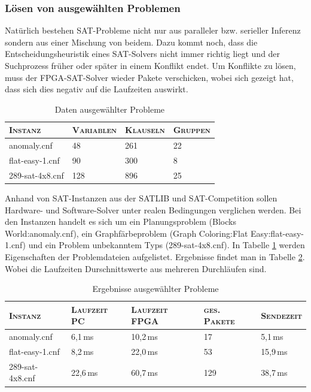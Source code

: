 \subsubsection{Lösen von ausgewählten Problemen}
Natürlich bestehen SAT-Probleme nicht nur aus paralleler
bzw. serieller Inferenz sondern aus einer Mischung von
beidem. Dazu kommt noch, dass die Entscheidungsheuristik
eines SAT-Solvers nicht immer richtig liegt und der
Suchprozess früher oder später in einem Konflikt endet.
Um Konflikte zu lösen, muss der FPGA-SAT-Solver wieder
Pakete verschicken, wobei sich gezeigt hat, dass sich dies
negativ auf die Laufzeiten auswirkt.
\begin{table}[h]
  \centering
  \begin{tabular}{|l|l|l|l|}
    \hline
    \textsc{Instanz} & \textsc{Variablen} & \textsc{Klauseln} &\textsc{Gruppen}\\
    \hline
    \hline
    anomaly.cnf & 48 & 261 & 22\\
    \hline
    flat-easy-1.cnf & 90 & 300 & 8\\
    \hline
    289-sat-4x8.cnf & 128 & 896 & 25\\
    \hline
  \end{tabular}
  \caption{Daten ausgewählter Probleme}
  \label{problems_data}
\end{table}
Anhand von SAT-Instanzen aus der SATLIB \cite{satlib:2003} und
SAT-Competition \cite{satcomp:2011}
sollen Hardware- und Software-Solver unter realen 
Bedingungen verglichen werden. Bei den Instanzen handelt es
sich um ein Planungsproblem (Blocks World:anomaly.cnf), 
ein Graphfärbeproblem (Graph Coloring:Flat Easy:flat-easy-1.cnf) 
und ein Problem unbekanntem Typs (289-sat-4x8.cnf).
In Tabelle \ref{problems_data} werden Eigenschaften der Problemdateien
aufgelistet. Ergebnisse findet man in Tabelle \ref{problems}. Wobei die Laufzeiten
Durschnittswerte aus mehreren Durchläufen sind.
\begin{table}[h]
  \centering
  \begin{tabular}{|l|l|l|l|l|}
    \hline
    \textsc{Instanz} & \textsc{Laufzeit PC} & \textsc{Laufzeit FPGA} &\textsc{ges. Pakete}&\textsc{Sendezeit}\\
    \hline
    \hline
    anomaly.cnf & 6,1\,ms & 10,2\,ms & 17 & 5,1\,ms\\
    \hline
    flat-easy-1.cnf & 8,2\,ms & 22,0\,ms & 53 & 15,9\,ms\\
    \hline
    289-sat-4x8.cnf & 22,6\,ms & 60,7\,ms & 129 & 38,7\,ms\\
    \hline
  \end{tabular}
  \caption{Ergebnisse ausgewählter Probleme}
  \label{problems}
\end{table}

